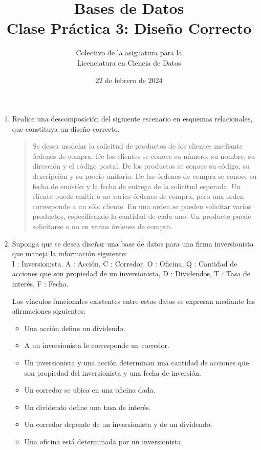 \documentclass{article}
\title{Bases de Datos\\[2mm]
Clase Pr\'actica 3: Dise\~no Correcto}
\author{Colectivo de la asignatura para la\\ Licenciatura en Ciencia de Datos}
\date{22 de febrero de 2024}
\begin{document}
\maketitle

\begin{enumerate}
\item Realice una descomposici\'on del siguiente escenario en esquemas relacionales, que constituya un dise\~no correcto. 

\begin{quote}
Se desea modelar la solicitud de productos de los clientes mediante \'ordenes de compra. De los
clientes se conoce su n\'umero, su nombre, su direcci\'on y el c\'odigo postal. De los productos se conoce 
su c\'odigo, su descripci\'on y su precio unitario. De las \'ordenes de compra se conoce su fecha de
emisi\'on y la fecha de entrega de la solicitud esperada. Un cliente puede emitir o no varias \'ordenes
de compra, pero una orden corresponde a un s\'olo cliente. En una orden se pueden solicitar varios
productos, especificando la cantidad de cada uno. Un producto puede solicitarse o no en varias
\'ordenes de compra.
\end{quote}

\item Suponga que se desea diseñar una base de datos para una firma inversionista que maneja la información siguiente:\\
I : Inversionista, A : Acción, C : Corredor, O : Oficina, Q : Cantidad de acciones que son propiedad de un inversionista, D : Dividendos, T : Tasa de interés, F : Fecha.

Los vínculos funcionales existentes entre estos datos se expresan mediante las afirmaciones siguientes:
\begin{itemize}
    \item Una acción define un dividendo.
    \item A un inversionista le corresponde un corredor.
    \item Un inversionista y una acción determinan una cantidad de acciones que son propiedad del inversionista y una fecha de inversión.
    \item Un corredor se ubica en una oficina dada.
    \item Un dividendo define una tasa de interés.
    \item Un corredor depende de un inversionista y de un dividendo. 
    \item Una oficina está determinada por un inversionista.
\end{itemize}


\end{enumerate}
\end{document}
